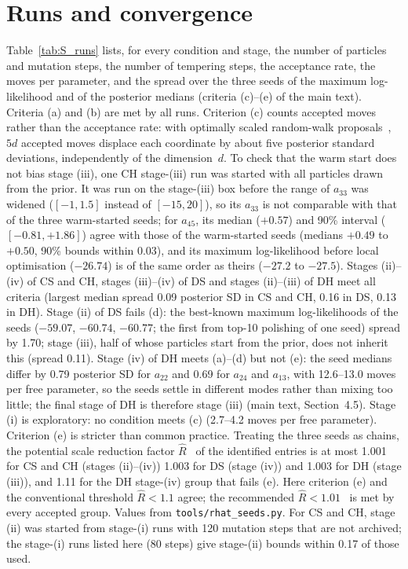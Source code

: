 \documentclass[11pt,a4paper]{article}
\begin{document}
\section{Runs and convergence}
\label{sec:S_runs}
Table~\ref{tab:S_runs} lists, for every condition and stage, the number of particles and mutation steps, the number of tempering steps, the acceptance rate, the moves per parameter, and the spread over the three seeds of the maximum log-likelihood and of the posterior medians (criteria (c)--(e) of the main text).
Criteria (a) and (b) are met by all runs.
Criterion (c) counts accepted moves rather than the acceptance rate: with optimally scaled random-walk proposals~\citep{RobertsRosenthal2001Optimal}, $5d$ accepted moves displace each coordinate by about five posterior standard deviations, independently of the dimension~$d$.
To check that the warm start does not bias stage (iii), one CH stage-(iii) run was started with all particles drawn from the prior. It was run on the stage-(iii) box before the range of $a_{33}$ was widened ($[-1,1.5]$ instead of $[-15,20]$), so its $a_{33}$ is not comparable with that of the three warm-started seeds; for $a_{45}$, its median ($+0.57$) and 90\% interval ($[-0.81,+1.86]$) agree with those of the warm-started seeds (medians $+0.49$ to $+0.50$, 90\% bounds within 0.03), and its maximum log-likelihood before local optimisation ($-26.74$) is of the same order as theirs ($-27.2$ to $-27.5$).
Stages (ii)--(iv) of CS and CH, stages (iii)--(iv) of DS and stages (ii)--(iii) of DH meet all criteria (largest median spread 0.09 posterior SD in CS and CH, 0.16 in DS, 0.13 in DH). Stage (ii) of DS fails (d): the best-known maximum log-likelihoods of the seeds ($-59.07$, $-60.74$, $-60.77$; the first from top-10 polishing of one seed) spread by 1.70; stage (iii), half of whose particles start from the prior, does not inherit this (spread 0.11). Stage (iv) of DH meets (a)--(d) but not (e): the seed medians differ by 0.79 posterior SD for $a_{22}$ and 0.69 for $a_{24}$ and $a_{13}$, with 12.6--13.0 moves per free parameter, so the seeds settle in different modes rather than mixing too little; the final stage of DH is therefore stage (iii) (main text, Section~4.5).
Stage (i) is exploratory: no condition meets (c) (2.7--4.2 moves per free parameter).
Criterion (e) is stricter than common practice. Treating the three seeds as chains, the potential scale reduction factor $\hat R$~\citep{GelmanRubin1992} of the identified entries is at most 1.001 for CS and CH (stages (ii)--(iv)) 1.003 for DS (stage (iv)) and 1.003 for DH (stage (iii)), and 1.11 for the DH stage-(iv) group that fails (e). Here criterion (e) and the conventional threshold $\hat R<1.1$ agree; the recommended $\hat R<1.01$~\citep{Vehtari2021Rhat} is met by every accepted group. Values from \texttt{tools/rhat\_seeds.py}.
For CS and CH, stage (ii) was started from stage-(i) runs with 120 mutation steps that are not archived; the stage-(i) runs listed here (80 steps) give stage-(ii) bounds within 0.17 of those used.
\end{document}
